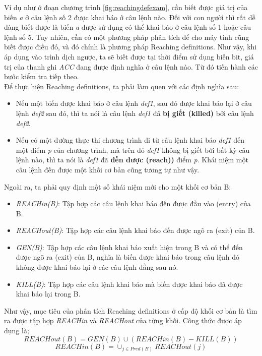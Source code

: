 Ví dụ như ở đoạn chương trình \ref{fig:reachingdefexam}, cần biết được giá trị của biến \textit{a} ở câu lệnh số 2 được khai báo ở câu lệnh nào. Đối với con người thì rất dễ dàng biết được là biến \textit{a} được sử dụng có thể khai báo ở câu lệnh số 1 hoặc câu lệnh số 5. Tuy nhiên, cần có một phương pháp phân tích để cho máy tính cũng biết được điều đó, và đó chính là phương pháp Reaching definitions. Như vậy, khi áp dụng vào trình dịch ngược, ta sẽ biết được tại thời điểm sử dụng biến bit, giá trị của thanh ghi \textit{ACC} đang được định nghĩa ở câu lệnh nào. Từ đó tiến hành các bước kiểm tra tiếp theo. \\

Để thực hiện Reaching definitions, ta phải làm quen với các định nghĩa sau:
\begin{itemize}
	\item Nếu một biến được khai báo ở câu lệnh \textit{def1}, sau đó được khai báo lại ở câu lệnh \textit{def2} sau đó, thì ta nói là câu lệnh \textit{def1} đã \textbf{bị giết (killed)} bởi câu lệnh \textit{def2}.
	\item Nếu có một đường thực thi chương trình đi từ câu lệnh khai báo \textit{def1} đến một điểm \textit{p} của chương trình, mà trên đó \textit{def1} không bị giết bởi bất kỳ câu lệnh nào, thì ta nói là \textit{def1} đã \textbf{đến được (reach))} điểm \textit{p}. Khái niệm một câu lệnh đến được một khối cơ bản cũng tương tự như vậy.
\end{itemize}

Ngoài ra, ta phải quy định một số khái niệm mới cho một khối cơ bản B:
\begin{itemize}
	\item \textit{REACHin(B)}: Tập hợp các câu lệnh khai báo đến được đầu vào (entry) của B.
	\item \textit{REACHout(B)}: Tập hợp các câu lệnh khai báo đến được ngõ ra (exit) của B.
	\item \textit{GEN(B)}: Tập hợp các câu lệnh khai báo xuất hiện trong B và có thể đến được ngõ ra (exit) của B, nghĩa là biến được khai báo trong câu lệnh đó không được khai báo lại ở các câu lệnh đằng sau nó.
	\item \textit{KILL(B)}: Tập hợp các câu lệnh khai báo mà biến được khai báo đã được khai báo lại trong B.
\end{itemize}

Như vậy, mục tiêu của phân tích Reaching definitions ở cấp độ khối cơ bản là tìm ra được tập hợp \textit{REACHin} và \textit{REACHout} của từng khối. Công thức được áp dụng là;
\begin{equation} \label{eq:reachout}
	REACHout(B) = GEN(B) \cup (REACHin(B)-KILL(B))
\end{equation}	
\begin{equation} \label{eq:reachin}
REACHin(B) = \cup_{j \in Pred(B)} REACHout(j)
\end{equation}	


